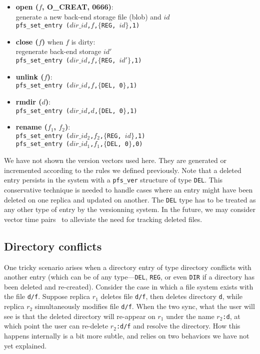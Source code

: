 \begin{itemize}
  \item \textbf{open ($f$, O\_CREAT, 0666)}: \\
    generate a new back-end storage file (blob) and $id$ \\
    {\tt pfs\_set\_entry ($dir\_id$,$f$,$\{$REG, $id$$\}$,1)}

  \item \textbf{close ($f$)} when $f$ is dirty: \\
    regenerate back-end storage $id'$ \\
    {\tt pfs\_set\_entry ($dir\_id$,$f$,$\{$REG, $id'$$\}$,1)}
    
  \item \textbf{unlink ($f$)}: \\
    {\tt pfs\_set\_entry ($dir\_id$,$f$,$\{$DEL, 0$\}$,1)}

  \item \textbf{rmdir ($d$)}: \\
    {\tt pfs\_set\_entry ($dir\_id$,$d$,$\{$DEL, 0$\}$,1)}

  \item \textbf{rename ($f_1$, $f_2$)}: \\
    {\tt pfs\_set\_entry ($dir\_id_2$,$f_2$,$\{$REG, $id$$\}$,1)} \\
    {\tt pfs\_set\_entry ($dir\_id_1$,$f_1$,$\{$DEL, 0$\}$,0)}
\end{itemize}

We have not shown the version vectors used here. They are generated or
incremented according to the rules we defined previously. Note that a
deleted entry persists in the system with a \texttt{pfs\_ver}
structure of type {\tt DEL}\@.  This conservative technique is needed
to handle cases where an entry might have been deleted on one replica
and updated on another. The {\tt DEL} type has to be treated as any
other type of entry by the versionning system.  In the future, we may
consider vector time pairs~\cite{cox:tra} to alleviate the need for
tracking deleted files.

\subsection{Directory conflicts}
\label{sec:dirconflict}

One tricky scenario arises when a directory entry of type directory
conflicts with another entry (which can be of any type---\texttt{DEL},
\texttt{REG}, or even \texttt{DIR} if a directory has been deleted and
re-created).  Consider the case in which a file system exists with the
file \texttt{d/f}.  Suppose replica $r_1$ deletes file \texttt{d/f},
then deletes directory \texttt{d}, while replica $r_2$ simultaneously
modifies file \texttt{d/f}.  When the two sync, what the user will see
is that the deleted directory will re-appear on $r_1$ under the name
\texttt{$r_2$:d}, at which point the user can re-delete
\texttt{$r_2$:d/f} and resolve the directory.  How this happens
internally is a bit more subtle, and relies on two behaviors we have
not yet explained.

